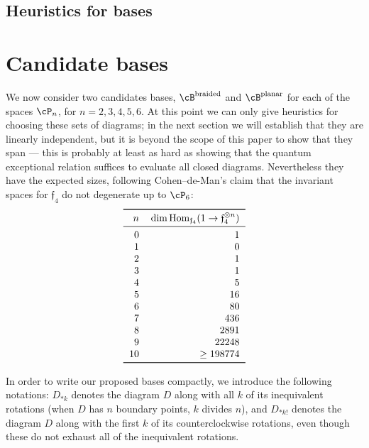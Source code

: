 \documentclass[12pt]{amsart}
\begin{document}
\subsection{Heuristics for bases}
\section{Candidate bases}
We now consider two candidates bases, $\cB^{\text{braided}}$ and $\cB^{\text
{planar}}$ for each of the spaces $\cP_n$, for $n = 2,3,4,5,6$.
At this point we can only give heuristics for choosing these sets of diagrams;
in the next section we will establish that they are linearly independent, but
it is beyond the scope of this paper to show that they span --- this is
probably at least as hard as showing that the quantum exceptional relation
suffices to evaluate all closed diagrams. Nevertheless they have the expected
sizes, following Cohen--de-Man's claim that the invariant spaces for
$\mathfrak{f}_4$ do not degenerate up to $\cP_6$:
\[
\begin{tabular}{rr}
  \toprule
  $n$ & $\dim \Hom_{\mathfrak{f}_4} (1 \to \mathfrak{f}_4^{\otimes n})$ \\
  \midrule
  0 & 1 \\ 1 & 0 \\ 2 & 1 \\ 3 & 1 \\ 4 & 5 \\ 5 & 16 \\
  6 & 80 \\ 7 & 436 \\ 8 & 2891 \\ 9 & 22248 \\ 10 & $\ge 198774$ \\
  \bottomrule
\end{tabular}
\]


\newcommand{\diagram}[2]{\mathfig{#1}{graphs/urn:sha1:#2.pdf}}

In order to write our proposed bases compactly, we introduce the following
notations: $D_{*k}$ denotes the diagram $D$ along with all $k$ of its
inequivalent rotations (when $D$ has $n$ boundary points, $k$ divides $n$),
and $D_{*k!}$ denotes the diagram $D$ along with the first $k$ of its
counterclockwise rotations, even though these do not exhaust all of the
inequivalent rotations.
\end{document}
